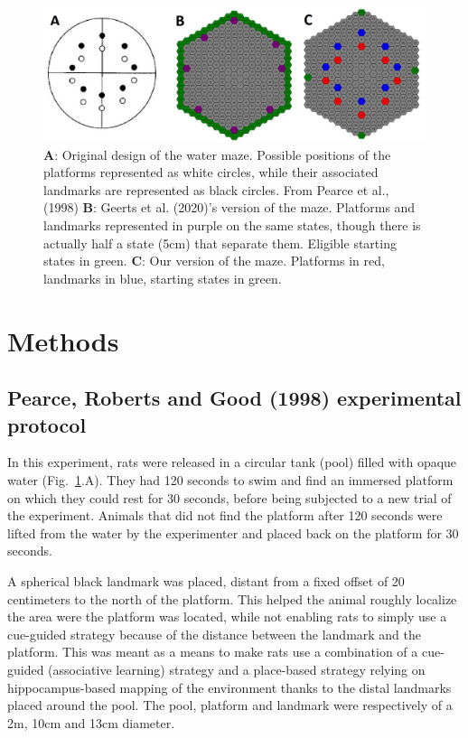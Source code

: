 \begin{figure}[htp]
    \centering
    \includegraphics[width=12cm]{Geerts_Original_Maze2.JPG}
    \caption{{\bf A}: Original design of the water maze. Possible positions of the platforms represented as white circles, while their associated landmarks are represented as black circles. From Pearce et al., (1998) {\bf B}: Geerts et al. (2020)'s version of the maze. Platforms and landmarks represented in purple on the same states, though there is actually half a state (5cm) that separate them. Eligible starting states in green. {\bf C}: Our version of the maze. Platforms in red, landmarks in blue, starting states in green.}
    \label{fig:maze}
\end{figure} 

\section{Methods}

\subsection{Pearce, Roberts and Good (1998) experimental protocol}
In this experiment, rats were released in a circular tank (pool) filled with opaque water (Fig.~\ref{fig:maze}.A). They had 120 seconds to swim and find an immersed platform on which they could rest for 30 seconds, before being subjected to a new trial of the experiment. Animals that did not find the platform after 120 seconds were lifted from the water by the experimenter and placed back on the platform for 30 seconds.

A spherical black landmark was placed, distant from a fixed offset of 20 centimeters to the north of the platform. This helped the animal roughly localize the area were the platform was located, while not enabling rats to simply use a cue-guided strategy because of the distance between the landmark and the platform. This was meant as a means to make rats use a combination of a cue-guided (associative learning) strategy and a place-based strategy relying on hippocampus-based mapping of the environment thanks to the distal landmarks placed around the pool. The pool, platform and landmark were respectively of a 2m, 10cm and 13cm diameter.

